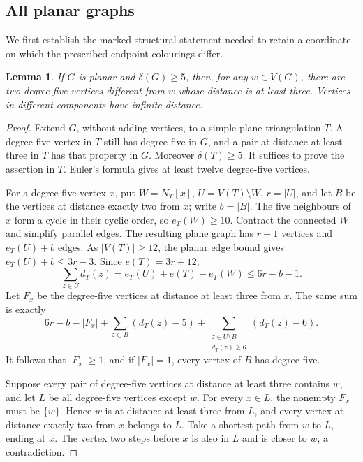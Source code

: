 \documentclass[11pt]{article}
\newtheorem{lemma}[theorem]{Lemma}
\theoremstyle{remark}
\numberwithin{equation}{section}
\numberwithin{table}{section}
\begin{document}
\subsection{All planar graphs}

We first establish the marked structural statement needed to retain a
coordinate on which the prescribed endpoint colourings differ.

\begin{lemma}
\label{lem:marked-five}
If $G$ is planar and $\delta(G)\ge5$, then, for any $w\in V(G)$,
there are two degree-five vertices different from $w$ whose distance is
at least three.  Vertices in different components have infinite distance.
\end{lemma}

\begin{proof}
Extend $G$, without adding vertices, to a simple plane triangulation
$T$.  A degree-five vertex in $T$ still has degree five in $G$, and a
pair at distance at least three in $T$ has that property in $G$.
Moreover $\delta(T)\ge5$.  It suffices to prove the assertion in $T$.
Euler's formula gives at least twelve degree-five vertices.

For a degree-five vertex $x$, put $W=N_T[x]$, $U=V(T)\setminus W$,
$r=|U|$, and let $B$ be the vertices at distance exactly two from $x$;
write $b=|B|$.  The five neighbours of $x$ form a cycle in their cyclic
order, so $e_T(W)\ge10$.  Contract the connected $W$ and simplify
parallel edges.  The resulting plane graph has $r+1$ vertices and
$e_T(U)+b$ edges.  As $|V(T)|\ge12$, the planar edge bound gives
$e_T(U)+b\le3r-3$.  Since $e(T)=3r+12$,
\[
 \sum_{z\in U}d_T(z)
 =e_T(U)+e(T)-e_T(W)\le6r-b-1.
\]
Let $F_x$ be the degree-five vertices at distance at least three from
$x$.  The same sum is exactly
\[
 6r-b-|F_x|
 +\sum_{z\in B}(d_T(z)-5)
 +\sum_{\substack{z\in U\setminus B\\ d_T(z)\ge6}}(d_T(z)-6).
\]
It follows that $|F_x|\ge1$, and if $|F_x|=1$, every vertex of $B$
has degree five.

Suppose every pair of degree-five vertices at distance at least three
contains $w$, and let $L$ be all degree-five vertices except $w$.
For every $x\in L$, the nonempty $F_x$ must be $\{w\}$.  Hence
$w$ is at distance at least three from $L$, and every vertex at distance
exactly two from $x$ belongs to $L$.  Take a shortest path from $w$
to $L$, ending at $x$.  The vertex two steps before $x$ is also in
$L$ and is closer to $w$, a contradiction.
\end{proof}
\end{document}
